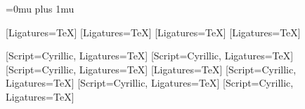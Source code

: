 \usepackage{url}
\Urlmuskip=0mu plus 1mu %
\DeclareUrlCommand{} 

\usepackage[siunitx, RPvoltages, american]{circuitikzgit}

\usepackage{iftex}

\ifXeTeX %
  \usepackage{xltxtra}
  \usepackage{fontspec}
  \usepackage{polyglossia}
  \setmainlanguage{russian}

  \setmainfont{Times New Roman}[Ligatures=TeX]
  [Ligatures=TeX]
  \setsansfont{Arial}[Ligatures=TeX]
  \setmonofont{Courier New}[Ligatures=TeX] 

\fi

\ifLuaTeX %
  \usepackage{fontspec}
  \usepackage{polyglossia}
  \setmainlanguage{russian}
  \setmainfont{Times New Roman}[Script=Cyrillic, Ligatures=TeX]
  [Script=Cyrillic, Ligatures=TeX]
  \setsansfont{Arial}[Script=Cyrillic, Ligatures=TeX]
  \setmonofont{Courier New}[Ligatures=TeX]
  [Script=Cyrillic, Ligatures=TeX]
  [Script=Cyrillic, Ligatures=TeX]
  [Script=Cyrillic, Ligatures=TeX]

\fi

\ifPDFTeX %
  \usepackage[T2A]{fontenc}
  \usepackage[english,russian]{babel}
  \usepackage[utf8]{inputenc}
  \usepackage[english, russian]{babel}

  \usepackage{amsmath}
  \usepackage{amsthm}
  \usepackage{amssymb}
  \usepackage{amsfonts}
  \usepackage{mathtext}
\fi

